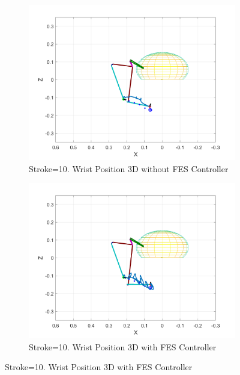 \begin{landscape}
\begin{figure}[ht]
        \begin{subfigure}[b]{0.33\textwidth}
            \centering
            \includegraphics[width=\linewidth]{Pictures/Results/Controller/Stroke10/20_wp_nofes.png}
            \caption{Stroke=10. Wrist Position 3D without FES Controller}
        \end{subfigure}%
        \hfill
        \begin{subfigure}[b]{0.33\textwidth}
            \centering
            \includegraphics[width=\linewidth]{Pictures/Results/Controller/Stroke10/20_wp_fes.png}
            \caption{Stroke=10. Wrist Position 3D with FES Controller}
        \end{subfigure}
        \hfill

\end{figure}
\end{landscape}
